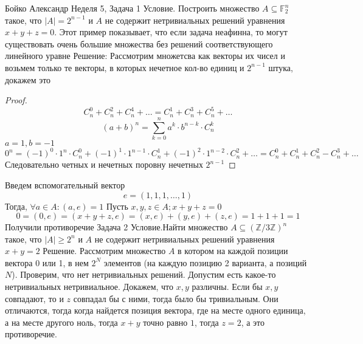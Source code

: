 \documentclass[a4paper,12pt]{article}
\numberwithin{equation}{section}
\theoremstyle{plain}
\theoremstyle{definition}
\theoremstyle{remark}
\def\Z{\mathbb {Z}}
\def\F{\mathbb {F}}
\begin{document}

Бойко Александр
\newline
\newline
Неделя 5, Задача 1 \newline
Условие. Построить множество $A \subseteq \F_2^n$
такое, что $|A| = 2^{n-1}$ и $A$ не содержит
нетривиальных решений уравнения $x+y+z = 0$.
Этот пример показывает, что если задача неафинна, то
могут существовать очень большие множества без
решений соответствующего линейного уравне \newline
Решение: \newline
Рассмотрим множетсва как векторы их чисел и возьмем только те векторы, в которых нечетное кол-во единиц и $2^{n-1}$ штука, докажем это
\begin{proof}
$$C_n^0 + C_n^2 + C_n^4 + \ldots = C_n^1 + C_n^3 + C_n^5 + \ldots$$
$$(a+b)^n = \sum_{k=0}^n a^k \cdot b^{n-k} \cdot C_n^k$$
$a=1, b=-1$
$$0^n = (-1)^0 \cdot 1^n \cdot C_n^0 + (-1)^1 \cdot 1^{n-1} \cdot C_n^1 +(-1)^2 \cdot 1^{n-2} \cdot C_n^2 + \ldots = C_n^0 + C_n^1 + C_n^2 - C_n^3 + \ldots$$
Следовательно четных и нечетных поровну \Rightarrow нечетных $2^{n-1}$
\end{proof}
Введем вспомогательный вектор $$e = (1,1,1, \ldots , 1)$$
Тогда, $\forall a \in A: (a,e) = 1$ \newline
Пусть $x,y,z \in A; x+y+z=0$ \newline
$$0 = (0,e) = (x+y+z, e) = (x,e) + (y,e) + (z,e) = 1+1+1 = 1$$
Получили противоречие \newline
Задача 2 \newline
Условие.Найти множество $A \subseteq (\Z/3\Z)^n$ такое, что $|A| \ge 2^n$ и $A$ не содержит нетривиальных решений уравнения $x+y = 2$ \newline
Решение. \newline
Рассмотрим множество $A$ в котором на каждой позиции вектора 0 или 1, в нем $2^N$ элементов (на каждую позицию 2 варианта, а позиций $N$). \newline
Проверим, что нет нетривиальных решений. \newline
Допустим есть какое-то нетривиальных нетривиальное. \newline
Докажем, что $x, y$ различны. Если бы $x, y$ совпадают, то и $z$ совпадал бы с ними, тогда было бы тривиальным. \newline
Они отличаются, тогда когда найдется позиция вектора, где на месте одного единица, а на месте другого ноль, тогда $x+y$ точно равно $1$, тогда $z=2$, а это противоречие.
\end{document}
